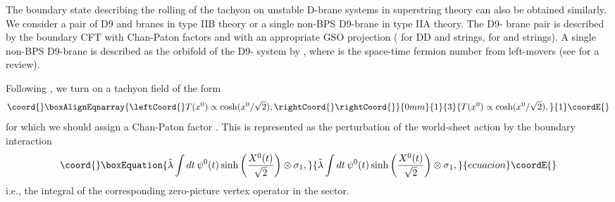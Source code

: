 \documentclass[a4paper,12pt]{article} \textheight=8.5truein
\begin{document}
The boundary state describing the rolling of the tachyon on
unstable D-brane systems in superstring theory can also be
obtained similarly. We consider a pair of D9 and \coordHE{}
branes in type IIB theory or a single non-BPS D9-brane in type IIA
theory. The D9-\coordHE{} brane pair is described by the
boundary CFT with \coordHE{} Chan-Paton factors and with an
appropriate GSO projection (\coordHE{} for DD and \coordHE{} strings, \coordHE{} for  \coordHE{} and
\coordHE{} strings). A single non-BPS D9-brane is described
as the orbifold of the D9-\coordHE{} system by \coordHE{},
where \coordHE{} is the space-time fermion number from left-movers (see
\cite{Sen:1999mg} for a review).


Following \cite{Sen:2002in}, we turn on a tachyon field
of the form
\begin{eqnarray}\coord{}\boxAlignEqnarray{\leftCoord{}
T(x^0)\propto \cosh(x^0/\sqrt{2}), \rightCoord{}
\rightCoord{}}{0mm}{1}{3}{
T(x^0)\propto \cosh(x^0/\sqrt{2}), 
}{1}\coordE{}\end{eqnarray}
for which we should assign a Chan-Paton factor \coordHE{}
\cite{Sen:1999mg}. This is represented as the perturbation of the
world-sheet action by the boundary interaction
\begin{equation}\coord{}\boxEquation{
  \tilde{\lambda} \int dt\, \psi^0(t) \sinh\left(
\frac{X^0 (t)}{\sqrt{2}}\right)\otimes\sigma_1,
}{
  \tilde{\lambda} \int dt\, \psi^0(t) \sinh\left(
\frac{X^0 (t)}{\sqrt{2}}\right)\otimes\sigma_1,
}{ecuacion}\coordE{}\end{equation}
i.e., the integral of the corresponding zero-picture vertex
operator in the \coordHE{} sector.
\end{document}
